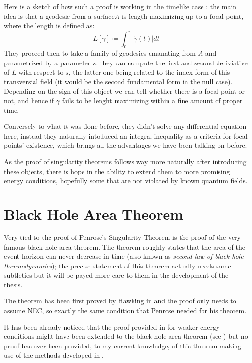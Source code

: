\documentclass[12pt, a4paper]{article}
\begin{document}
Here is a sketch of how such a proof is working in the timelike case \cite{fewster2020new}: the main idea is that a geodesic from a surface\( A\) is length maximizing up to a focal point, where the length is defined as:
\[
L[\gamma] \coloneqq \int_{0}^{\tau} |\dot{\gamma}(t) |dt
\]
They proceed then to take a family of geodesics emanating from \(A\) and parametrized by a parameter \(s\): they can compute the first and second deriviative of \(L\) with respect to \(s\), the latter one being related to the index form of this transversial field (it would be the second fundamental form in the null case).
Depending on the sign of this object we can tell whether there is a focal point or not, and hence if \(\gamma\) fails to be lenght maximizing within a fine amount of proper time.

Conversely to what it was done before, they didn't solve any differential equation here, instead they naturally intoduced an integral inequality as a criteria for focal points' existence, which brings all the advantages we have been talking on before.

As the proof of singularity theorems follows way more naturally after introducing these objects, there is hope in the ability to extend them to more promising energy conditions, hopefully some that are not violated by known quantum fields.

\section{Black Hole Area Theorem}
Very tied to the proof of Penrose's Singularity Theorem is the proof of the very famous black hole area theorem.
The theorem roughly states that the area of the event horizon can never decrease in time (also known as \emph{second law of black hole thermodynamics}); the precise statement of this theorem actually needs some subtleties but it will be payed more care to them in the development of the thesis.

The theorem has been first proved by Hawking in %
and the proof only needs to assume NEC, so exactly the same condition that Penrose needed for his theorem.

It has been already noticed that the proof provided in \cite{fewster2011singularity}
for weaker energy conditions might have been extended to the black hole area theorem (see \cite{lesourd2018remark}) but no proof has ever been provided, to my current knowledge, of this theorem making use of the methods developed in \cite{fewster2020new}.
\end{document}
